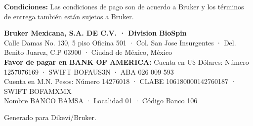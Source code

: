 \documentclass[12pt,spanish]{scrartcl}
\begin{document}
\vspace{2ex}
\noindent\textbf{Condiciones:} Las condiciones de pago son de acuerdo a Bruker y los términos de entrega también están sujetos a Bruker.

\vspace{1ex}\footnotesize
\noindent\textbf{Bruker Mexicana, S.A. DE C.V. · Division BioSpin}\\
Calle Damas No. 130, 5 piso Oficina 501 · Col. San Jose Insurgentes · Del. Benito Juarez, C.P 03900 · Ciudad de México, México\\[0.5ex]
\textbf{Favor de pagar en BANK OF AMERICA:} Cuenta en U\$ Dólares: Número 1257076169 · SWIFT BOFAUS3N · ABA 026 009 593\\
Cuenta en M.N. Pesos: Número 14276018 · CLABE 106180000142760187 · SWIFT BOFAMXMX\\
Nombre BANCO BAMSA · Localidad 01 · Código Banco 106

\vfill\noindent\scriptsize Generado para Dikevi/Bruker.
\end{document}

